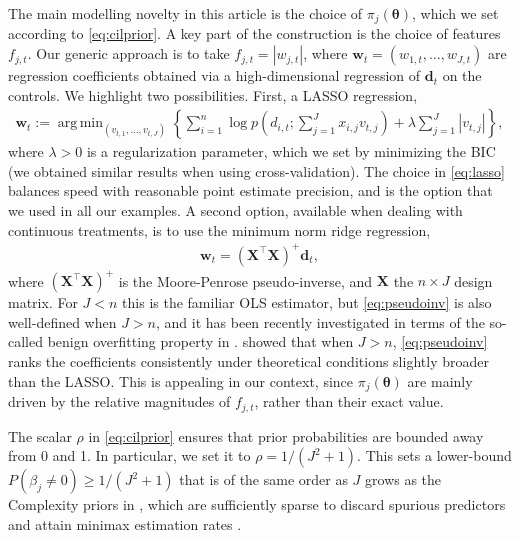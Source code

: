 \documentclass[12pt]{article}
\newcommand{\mb}[1]{\mathbf{#1}}
\newcommand{\tr}[1]{#1^{\intercal}}
\DeclareMathOperator*{\argmin}{arg\,min}
\newcommand{\bd}{{\mb{d}}}
\newcommand{\bX}{{\mb{X}}}
\newcommand{\bw}{{\mb{w}}}
\newcommand{\btheta}{{\bm{\theta}}}
\begin{document}
The main modelling novelty in this article is the choice of $\pi_{j}(\btheta)$, which we set according to \eqref{eq:cilprior}. A key part of the construction is the choice of features $f_{j,t}$. Our generic approach is to take $f_{j,t} = |w_{j,t}|$, where $\bw_t = (w_{1,t},\ldots, w_{J,t})$ are regression coefficients obtained via a high-dimensional regression of $\bd_t$ on the controls. We highlight two possibilities. First, a LASSO regression,
\begin{align}
\bw_{t} := \argmin_{(v_{t,1}, \dots, v_{t,J})} \left\{ \sum_{i=1}^{n} \log p\left( d_{i,t}; \sum_{j=1}^{J} x_{i,j} v_{t,j} \right) + \lambda \sum_{j=1}^{J} |v_{t,j}| \right\}, \label{eq:lasso}
\end{align}
where $\lambda > 0$ is a regularization parameter, which we set by minimizing the BIC (we obtained similar results when using cross-validation). 
The choice in \eqref{eq:lasso} balances speed with reasonable point estimate precision, and is the option that we used in all our examples.
A second option, available when dealing with continuous treatments, is to use the minimum norm ridge regression,
\begin{align}
\mb{w}_{t} =  \left( \tr{\bX} \bX \right)^{+} \bd_{t}, \label{eq:pseudoinv}
\end{align}
where $\left( \tr{\bX} \bX \right)^{+}$ is the Moore-Penrose pseudo-inverse, and $\bX$ the $n \times J$ design matrix. For $J<n$ this is the familiar OLS estimator, but \eqref{eq:pseudoinv} is also well-defined when $J>n$, and it has been recently investigated in terms of the so-called benign overfitting property in \cite{Bartlett20}. \cite{Wang16} showed that when $J>n$, \eqref{eq:pseudoinv} ranks the coefficients consistently under theoretical conditions slightly broader than the LASSO.
This is appealing in our context, since $\pi_j(\btheta)$ are mainly driven by the relative magnitudes of $f_{j,t}$, rather than their exact value. 

The scalar $\rho$ in \eqref{eq:cilprior} ensures that prior probabilities are bounded away from 0 and 1. %
In particular, we set it to $\rho = 1/(J^2 + 1)$. 
This sets a lower-bound $P(\beta_j \neq 0) \geq 1/(J^2+1)$ that is of the same order as $J$ grows as the Complexity priors in \citep{Castillo12}, which are sufficiently sparse to discard spurious predictors and attain minimax estimation rates \citep{Castillo15,Rossell21}.
\end{document}
